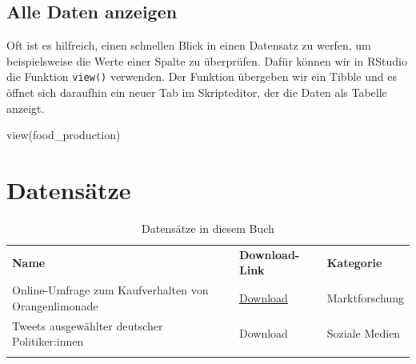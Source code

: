 \documentclass[
]{book}
\newenvironment{Shaded}{\begin{snugshade}}{\end{snugshade}}
\newcommand{\FunctionTok}[1]{\textcolor[rgb]{0.00,0.00,0.00}{#1}}
\newcommand{\NormalTok}[1]{#1}
\begin{document}
\hypertarget{alle-daten-anzeigen}{%
\section{Alle Daten anzeigen}\label{alle-daten-anzeigen}}

Oft ist es hilfreich, einen schnellen Blick in einen Datensatz zu werfen, um beispielsweise die Werte einer Spalte zu überprüfen. Dafür können wir in RStudio die Funktion \texttt{view()} verwenden. Der Funktion übergeben wir ein Tibble und es öffnet sich daraufhin ein neuer Tab im Skripteditor, der die Daten als Tabelle anzeigt.

\begin{Shaded}
\begin{Highlighting}[]
\FunctionTok{view}\NormalTok{(food\_production)}
\end{Highlighting}
\end{Shaded}

\hypertarget{datensaetze}{%
\chapter{Datensätze}\label{datensaetze}}

\begin{longtable}[]{@{}
  >{\raggedright\arraybackslash}p{}
  >{\raggedright\arraybackslash}p{}
  >{\raggedright\arraybackslash}p{}@{}}
\caption{Datensätze in diesem Buch}\tabularnewline
\toprule
\endhead
\textbf{Name} & \textbf{Download-Link} & \textbf{Kategorie} \\
Online-Umfrage zum Kaufverhalten von Orangenlimonade & \href{datasets/limonade.csv}{Download} & Marktforschung \\
Tweets ausgewählter deutscher Politiker:innen & Download & Soziale Medien \\
& & \\
\bottomrule
\end{longtable}

  
\end{document}
